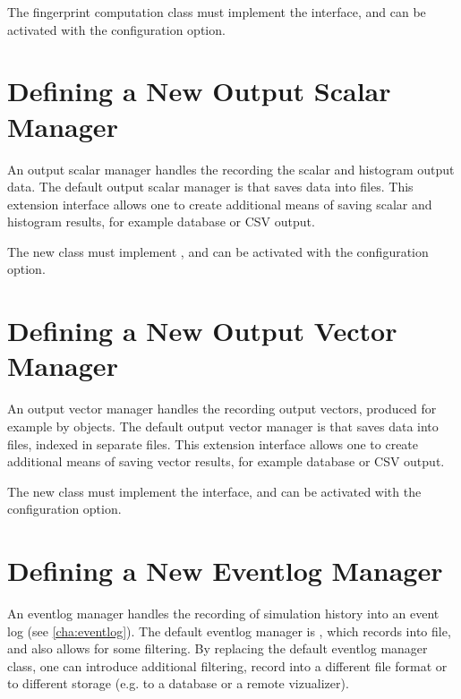 
The fingerprint computation class must implement the  interface,
and can be activated with the  configuration option.


\section{Defining a New Output Scalar Manager}
\label{sec:plugin-exts:outputscalarmanager}

An output scalar manager handles the recording the scalar and histogram
output data. The default output scalar manager is
 that saves data into  files.
This extension interface allows one to create additional means of saving
scalar and histogram results, for example database or CSV output.

The new class must implement , and can be
activated with the  configuration
option.


\section{Defining a New Output Vector Manager}
\label{sec:plugin-exts:outputvectormanager}

An output vector manager handles the recording output vectors, produced
for example by  objects. The default output vector
manager is  that saves data into
 files, indexed in separate  files. This extension
interface allows one to create additional means of saving vector results,
for example database or CSV output.

The new class must implement the  interface,
and can be activated with the 
configuration option.


\section{Defining a New Eventlog Manager}
\label{sec:plugin-exts:eventlogmanager}

An eventlog manager handles the recording of simulation history into an
event log (see \ref{cha:eventlog}). The default eventlog manager is
, which records into file, and also allows for
some filtering. By replacing the default eventlog manager class, one can
introduce additional filtering, record into a different file format or
to different storage (e.g. to a database or a remote vizualizer).


